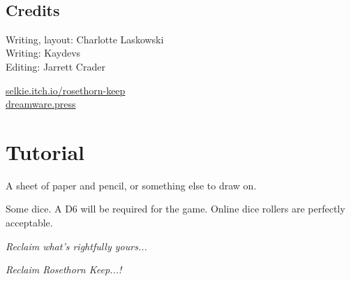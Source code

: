 \documentclass[english,10pt,openany,a5paper]{book}
\newcommand\blankpage{%
	\newpage 
	
	\thispagestyle{empty}%
	\
	
	\newpage }
\begin{document}
	
	
	
	\blankpage
	
	\section{Credits}
	
	\thispagestyle{empty}
	
	Writing, layout: Charlotte Laskowski\\
	Writing: Kaydevs\\
	Editing: Jarrett Crader
	
	\skipline\skipline
	\skipline
	
	\href{https://selkie.itch.io/rosethorn-keep}{selkie.itch.io/rosethorn-keep}\\
	\href{https://dreamware.press}{dreamware.press}
	
	\newpage
	

	
	\toc[2]
	
	\thispagestyle{empty}
	
	
	\chapter{Tutorial}
	
	\thispagestyle{empty}
	
	
	\header{Materials}
	\tld  A sheet of paper and pencil, or something else to draw on.
	
	\tld  Some dice. A D6 will be required for the game. Online dice rollers are perfectly acceptable.
	
	\skipline
	\begin{adjustbox}{left}
		\em Reclaim what’s rightfully yours...\em
	\end{adjustbox}
	\begin{adjustbox}{right}
		\em Reclaim Rosethorn Keep...! \em
	\end{adjustbox}
	
	
	
	
	
	
	
	
	
	\pagebreak
	
	
	\pagestyle{empty}
	
	\begin{adjustbox}{fbox=1pt}
	\end{adjustbox}
	
\end{document}
